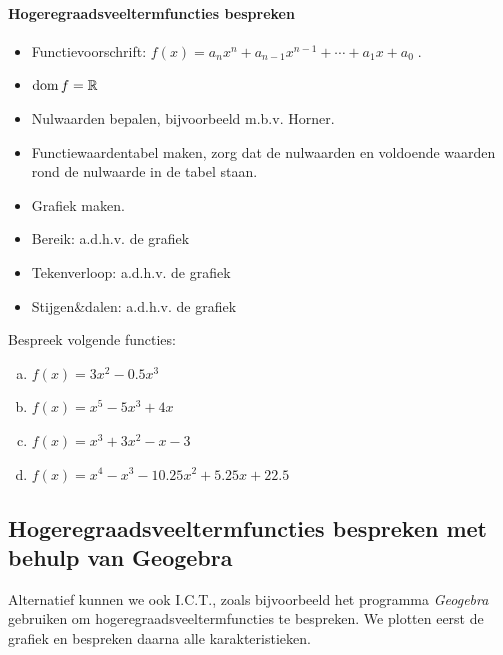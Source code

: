 \documentclass[12pt]{article}
\begin{document}
\paragraph*{Hogeregraadsveeltermfuncties bespreken}
\begin{mdframed}
  \begin{itemize}
  \item Functievoorschrift: $f(x)= a_nx^n + a_{n-1}x^{n-1} + \cdots + a_1x + a_0\;.$
  \item $\dom f = \mathbb{R}$
  \item Nulwaarden bepalen, bijvoorbeeld m.b.v. Horner.
  \item Functiewaardentabel maken, zorg dat de nulwaarden en voldoende waarden rond de nulwaarde in de tabel staan.
  \item Grafiek maken.
  \item Bereik: a.d.h.v. de grafiek
  \item Tekenverloop: a.d.h.v. de grafiek
  \item Stijgen\&dalen: a.d.h.v. de grafiek
  \end{itemize}
\end{mdframed}

\begin{oefening}
  Bespreek volgende functies:
  \begin{enumerate}[(a)]
  \itemsep.5em
  \item $f(x)=3x^2-0.5x^3$
  \item $f(x)=x^5-5x^3+4x$
  \item $f(x)=x^3+3x^2-x-3$
  \item $f(x)=x^4-x^3-10.25x^2+5.25x+22.5$
  \end{enumerate}
\end{oefening}

\pagebreak
\subsection{Hogeregraadsveeltermfuncties bespreken met behulp van Geogebra}
Alternatief kunnen we ook I.C.T., zoals bijvoorbeeld het programma {\em Geogebra} gebruiken om hogeregraadsveeltermfuncties te bespreken. We plotten eerst de grafiek en bespreken daarna alle karakteristieken.
\end{document}
